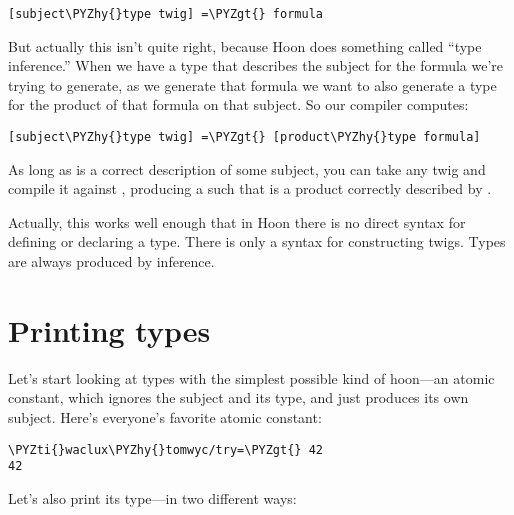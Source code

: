 \begin{framed_shaded}
\begin{Verbatim}[fontsize=\relsize{-2.5},fontseries=b,commandchars=\\\{\}]
[subject\PYZhy{}type twig] =\PYZgt{} formula
\end{Verbatim}
\end{framed_shaded}
But actually this isn't quite right, because Hoon does something
called ``type inference.''  When we have a type that describes the
subject for the formula we're trying to generate, as we generate
that formula we want to also generate a type for the product of
that formula on that subject.  So our compiler computes:

\begin{framed_shaded}
\begin{Verbatim}[fontsize=\relsize{-2.5},fontseries=b,commandchars=\\\{\}]
[subject\PYZhy{}type twig] =\PYZgt{} [product\PYZhy{}type formula]
\end{Verbatim}
\end{framed_shaded}
As long as  is a correct description of some
subject, you can take any twig and compile it against
, producing a  such that  is a product correctly described by .

Actually, this works well enough that in Hoon there is no direct
syntax for defining or declaring a type.  There is only a syntax
for constructing twigs.  Types are always produced by inference.

\section{Printing types}

Let's start looking at types with the simplest possible kind of
hoon---an atomic constant, which ignores the subject and its
type, and just produces its own subject.  Here's everyone's
favorite atomic constant:

\begin{framed_shaded}
\begin{Verbatim}[fontsize=\relsize{-2.5},fontseries=b,commandchars=\\\{\}]
\PYZti{}waclux\PYZhy{}tomwyc/try=\PYZgt{} 42
42
\end{Verbatim}
\end{framed_shaded}
Let's also print its type---in two different ways:

